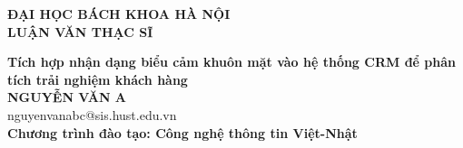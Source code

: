\documentclass[LuanVan.tex]{subfiles}
\begin{document}
\begin{titlepage}
\thispagestyle{empty}
\begin{center}

{\textbf{\large{ĐẠI HỌC BÁCH KHOA HÀ NỘI}}}\\[4cm]

{\textbf{\huge{ LUẬN VĂN THẠC SĨ}}}\\[1cm]
{\textbf{\Large{Tích hợp nhận dạng biểu cảm khuôn mặt vào hệ thống CRM để phân tích trải nghiệm khách hàng}}\\[1cm]

{\textbf{\large{NGUYỄN VĂN A}}}\\
{\large{nguyenvanabc@sis.hust.edu.vn}}\\[0.5cm]

{\textbf{\large{Chương trình đào tạo: Công nghệ thông tin Việt-Nhật
}}}\\

\vspace{4cm}
\begin{table}[H]
\centering
{}
\end{table}}
\end{center}



\end{titlepage}
\end{document}
